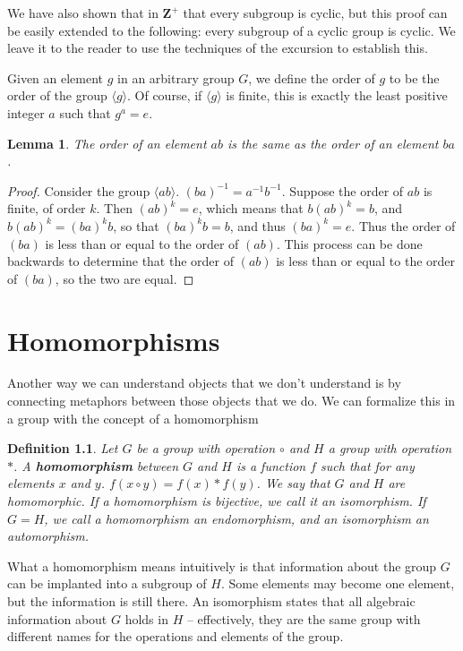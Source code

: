 \documentclass[12pt]{report}
\newtheorem{lemma}[theorem]{Lemma}
\newtheorem{definition}{Definition}
\begin{document}
We have also shown that in $\mathbf{Z}^+$ that every subgroup is cyclic, but this proof can be easily extended to the following: every subgroup of a cyclic group is cyclic. We leave it to the reader to use the techniques of the excursion to establish this.

Given an element $g$ in an arbitrary group $G$, we define the order of $g$ to be the order of the group $\langle g \rangle$. Of course, if $\langle g \rangle$ is finite, this is exactly the least positive integer $a$ such that $g^a = e$.

\begin{lemma} The order of an element $ab$ is the same as the order of an element $ba$. \end{lemma}
\begin{proof}
    Consider the group $\langle ab \rangle$.
    $(ba)^{-1} = a^{-1}b^{-1}$.
    Suppose the order of $ab$ is finite, of order $k$. Then $(ab)^k = e$, which means that $b(ab)^k = b$, and $b(ab)^k = (ba)^k b$, so that $(ba)^k b = b$, and thus $(ba)^k = e$. Thus the order of $(ba)$ is less than or equal to the order of $(ab)$. This process can be done backwards to determine that the order of $(ab)$ is less than or equal to the order of $(ba)$, so the two are equal.
\end{proof}

\chapter{Homomorphisms}

Another way we can understand objects that we don't understand is by connecting metaphors between those objects that we do. We can formalize this in a group with the concept of a homomorphism

\begin{definition}
Let $G$ be a group with operation $\circ$ and $H$ a group with operation $*$. A {\bf homomorphism} between $G$ and $H$ is a function $f$ such that for any elements $x$ and $y$. $f(x \circ y) = f(x) * f(y)$. We say that $G$ and $H$ are homomorphic. If a homomorphism is bijective, we call it an isomorphism. If $G = H$, we call a homomorphism an endomorphism, and an isomorphism an automorphism.
\end{definition}

What a homomorphism means intuitively is that information about the group $G$ can be implanted into a subgroup of $H$. Some elements may become one element, but the information is still there. An isomorphism states that all algebraic information about $G$ holds in $H$ -- effectively, they are the same group with different names for the operations and elements of the group.
\end{document}
